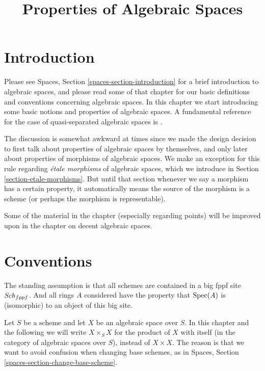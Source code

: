 

%


\title{Properties of Algebraic Spaces}


\maketitle

\label{section-phantom}

\tableofcontents

\section{Introduction}
\label{section-introduction}

\noindent
Please see
Spaces, Section \ref{spaces-section-introduction}
for a brief introduction to algebraic spaces, and please read
some of that chapter for our basic definitions and conventions
concerning algebraic spaces. In this chapter we start introducing
some basic notions and properties of algebraic spaces. A fundamental
reference for the case of quasi-separated algebraic spaces is
\cite{Kn}.

\medskip\noindent
The discussion is somewhat awkward at times since we made the design
decision to first talk about properties of algebraic spaces by
themselves, and only later about properties of morphisms of algebraic
spaces. We make an exception for this rule regarding
{\it \'etale morphisms} of algebraic spaces, which we introduce in
Section \ref{section-etale-morphisms}.
But until that section whenever we say a morphism has a certain property, it
automatically means the source of the morphism is a scheme (or perhaps the
morphism is representable).

\medskip\noindent
Some of the material in the chapter (especially regarding points)
will be improved upon in the chapter on decent algebraic spaces.


\section{Conventions}
\label{section-conventions}

\noindent
The standing assumption is that all schemes are contained in
a big fppf site $\mathit{Sch}_{fppf}$. And all rings $A$ considered
have the property that $\mathop{\mathrm{Spec}}(A)$ is (isomorphic) to an
object of this big site.

\medskip\noindent
Let $S$ be a scheme and let $X$ be an algebraic space over $S$.
In this chapter and the following we will write $X \times_S X$
for the product of $X$ with itself (in the category of algebraic
spaces over $S$), instead of $X \times X$. The reason is that we
want to avoid confusion when changing base schemes, as in
Spaces, Section \ref{spaces-section-change-base-scheme}.


